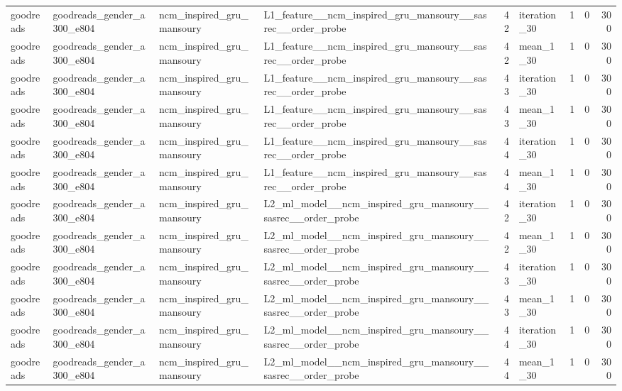 \begin{table}[htbp!]
\begin{tabular}{llllrlrrr}
goodreads & goodreads\_gender\_a300\_e804 & ncm\_inspired\_gru\_mansoury & L1\_feature\_\_ncm\_inspired\_gru\_mansoury\_\_sasrec\_\_order\_probe & 42 & iteration\_30 & 1 & 0 & 300 \\
goodreads & goodreads\_gender\_a300\_e804 & ncm\_inspired\_gru\_mansoury & L1\_feature\_\_ncm\_inspired\_gru\_mansoury\_\_sasrec\_\_order\_probe & 42 & mean\_1\_30 & 1 & 0 & 300 \\
goodreads & goodreads\_gender\_a300\_e804 & ncm\_inspired\_gru\_mansoury & L1\_feature\_\_ncm\_inspired\_gru\_mansoury\_\_sasrec\_\_order\_probe & 43 & iteration\_30 & 1 & 0 & 300 \\
goodreads & goodreads\_gender\_a300\_e804 & ncm\_inspired\_gru\_mansoury & L1\_feature\_\_ncm\_inspired\_gru\_mansoury\_\_sasrec\_\_order\_probe & 43 & mean\_1\_30 & 1 & 0 & 300 \\
goodreads & goodreads\_gender\_a300\_e804 & ncm\_inspired\_gru\_mansoury & L1\_feature\_\_ncm\_inspired\_gru\_mansoury\_\_sasrec\_\_order\_probe & 44 & iteration\_30 & 1 & 0 & 300 \\
goodreads & goodreads\_gender\_a300\_e804 & ncm\_inspired\_gru\_mansoury & L1\_feature\_\_ncm\_inspired\_gru\_mansoury\_\_sasrec\_\_order\_probe & 44 & mean\_1\_30 & 1 & 0 & 300 \\
goodreads & goodreads\_gender\_a300\_e804 & ncm\_inspired\_gru\_mansoury & L2\_ml\_model\_\_ncm\_inspired\_gru\_mansoury\_\_sasrec\_\_order\_probe & 42 & iteration\_30 & 1 & 0 & 300 \\
goodreads & goodreads\_gender\_a300\_e804 & ncm\_inspired\_gru\_mansoury & L2\_ml\_model\_\_ncm\_inspired\_gru\_mansoury\_\_sasrec\_\_order\_probe & 42 & mean\_1\_30 & 1 & 0 & 300 \\
goodreads & goodreads\_gender\_a300\_e804 & ncm\_inspired\_gru\_mansoury & L2\_ml\_model\_\_ncm\_inspired\_gru\_mansoury\_\_sasrec\_\_order\_probe & 43 & iteration\_30 & 1 & 0 & 300 \\
goodreads & goodreads\_gender\_a300\_e804 & ncm\_inspired\_gru\_mansoury & L2\_ml\_model\_\_ncm\_inspired\_gru\_mansoury\_\_sasrec\_\_order\_probe & 43 & mean\_1\_30 & 1 & 0 & 300 \\
goodreads & goodreads\_gender\_a300\_e804 & ncm\_inspired\_gru\_mansoury & L2\_ml\_model\_\_ncm\_inspired\_gru\_mansoury\_\_sasrec\_\_order\_probe & 44 & iteration\_30 & 1 & 0 & 300 \\
goodreads & goodreads\_gender\_a300\_e804 & ncm\_inspired\_gru\_mansoury & L2\_ml\_model\_\_ncm\_inspired\_gru\_mansoury\_\_sasrec\_\_order\_probe & 44 & mean\_1\_30 & 1 & 0 & 300 \\

\end{tabular}
\end{table}
